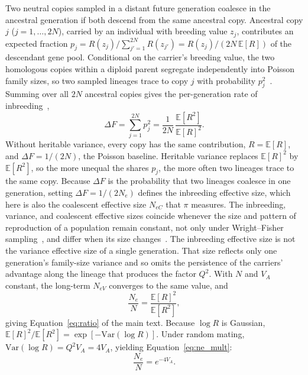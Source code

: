 \documentclass{article}
\begin{document}
Two neutral copies sampled in a distant future generation coalesce in the ancestral generation if both descend from the same ancestral copy. Ancestral copy $j$ ($j = 1, \dots, 2N$), carried by an individual with breeding value $z_j$, contributes an expected fraction $p_j = R(z_j)/\sum_{j'=1}^{2N} R(z_{j'}) = R(z_j)/(2N\,\mathbb{E}[R])$ of the descendant gene pool. Conditional on the carrier's breeding value, the two homologous copies within a diploid parent segregate independently into Poisson family sizes, so two sampled lineages trace to copy $j$ with probability $p_j^2$~\cite{barton2011}. Summing over all $2N$ ancestral copies gives the per-generation rate of inbreeding~\cite{wray1990},
\begin{equation}
    \Delta F = \sum_{j=1}^{2N} p_j^2 = \frac{1}{2N}\,\frac{\mathbb{E}[R^2]}{\mathbb{E}[R]^2}. \label{eq:B_dF}
\end{equation}
Without heritable variance, every copy has the same contribution, $R = \mathbb{E}[R]$, and $\Delta F = 1/(2N)$, the Poisson baseline. Heritable variance replaces $\mathbb{E}[R]^2$ by $\mathbb{E}[R^2]$, so the more unequal the shares $p_j$, the more often two lineages trace to the same copy. Because $\Delta F$ is the probability that two lineages coalesce in one generation, setting $\Delta F = 1/(2N_e)$ defines the inbreeding effective size, which here is also the coalescent effective size $N_{eC}$ that $\pi$ measures. The inbreeding, variance, and coalescent effective sizes coincide whenever the size and pattern of reproduction of a population remain constant, not only under Wright--Fisher sampling~\cite{caballero1994}, and differ when its size changes~\cite{crow1988}. The inbreeding effective size is not the variance effective size of a single generation. That size reflects only one generation's family-size variance and so omits the persistence of the carriers' advantage along the lineage that produces the factor $Q^2$. With $N$ and $V_A$ constant, the long-term $N_{eV}$ converges to the same value, and
\begin{equation}
    \frac{N_e}{N} = \frac{\mathbb{E}[R]^2}{\mathbb{E}[R^2]}, \label{eq:B_ratio}
\end{equation}
giving Equation~\eqref{eq:ratio} of the main text. Because $\log R$ is Gaussian, $\mathbb{E}[R]^2/\mathbb{E}[R^2] = \exp[-\mathrm{Var}(\log R)]$. Under random mating, $\mathrm{Var}(\log R) = Q^2V_A = 4V_A$, yielding Equation~\eqref{eq:ne_mult}:
\begin{equation}
    \frac{N_e}{N} = e^{-4V_A}. \label{eq:B_mult}
\end{equation}
\end{document}
